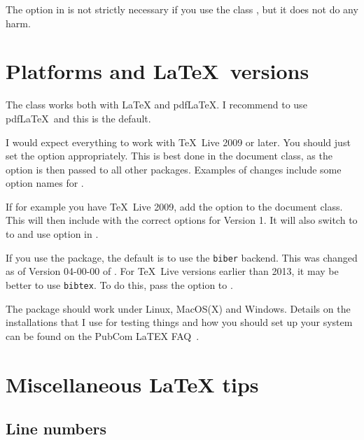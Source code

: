 The  option in  is not strictly necessary if you use the class ,
but it does not do any harm.


\section{Platforms and \LaTeX\ versions}
\label{sec:version}

The  class works both with \LaTeX{} and pdf\LaTeX{}.
I recommend to use pdf\LaTeX\ and this is the default.

I would expect everything to work with \TeX\ Live 2009 or later.
You should just set the option  appropriately.
This is best done in the document class, as the option is then passed to all other packages.
Examples of changes include some option names for .

If for example you have \TeX\ Live 2009, add the option  to the document class.
This will then include  with the correct options for Version 1.
It will also switch to  to 
and use option  in .

If you use the  package,
the default is to use the \texttt{biber} backend.
This was changed as of Version 04-00-00 of .
For \TeX\ Live versions earlier than 2013, it may be better to use \texttt{bibtex}.
To do this, pass the option  to .

The  package should work under Linux, MacOS(X) and Windows.
Details on the installations that I use for testing things
and how you should set up your system can be found on the PubCom LaTEX FAQ~\cite{latex-faq}.


\section{Miscellaneous \LaTeX{} tips}
\label{sec:latex}

\subsection{Line numbers}

